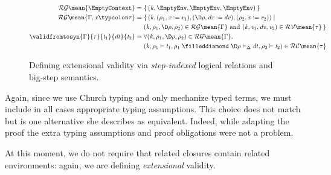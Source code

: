 \begin{figure}[h!]
\begin{align*}
                  \\
  \ensuremath{\mathcal{RG}\mean{\EmptyContext}} ={} & \{ \, \ensuremath{(\Varid{k},\EmptyEnv,\EmptyEnv,\EmptyEnv)} \, \} \\
  \ensuremath{\mathcal{RG}\mean{\Gamma,\Varid{x}\typcolon\tau}} ={} &
                                  \{ \, \ensuremath{(\Varid{k},(\rho_{1},\Varid{x}\mathbin{:=}\Varid{v}_{1}),(\D\rho,\Varid{dx}\mathbin{:=}\Varid{dv}),(\rho_{2},\Varid{x}\mathbin{:=}\Varid{v}_{2}))\mid\\&(\Varid{k},\rho_{1},\D\rho,\rho_{2})\in \mathcal{RG}\mean{\Gamma}\text{ and }(\Varid{k},\Varid{v}_{1},\Varid{dv},\Varid{v}_{2})\in \mathcal{RV}\mean{\tau}} \, \} \\
  \ensuremath{\validfromtosyn{\Gamma}{\tau}{\Varid{t}_{1}}{\Varid{dt}}{\Varid{t}_{2}}} ={}&
                                      \ensuremath{\forall (\Varid{k},\rho_{1},\D\rho,\rho_{2})\in \mathcal{RG}\mean{\Gamma}\hsforall \hsdot{\circ }{\mathpunct{.}}\\&(\Varid{k},\rho_{1}\vdash\Varid{t}_{1},\rho_{1}\mathrel{\filleddiamond}\D\rho\vdash_{\Delta}\Varid{dt},\rho_{2}\vdash\Varid{t}_{2})\in \mathcal{RC}\mean{\tau}}
\end{align*}
\caption{Defining extensional validity via \emph{step-indexed} logical relations and big-step semantics.}
\label{fig:big-step-validity-ext-si}
\end{figure}

Again, since we use Church typing and only mechanize typed terms, we
must include in all cases appropriate typing assumptions. This
choice does not match \citet{Ahmed2006stepindexed} but is
one alternative she describes as equivalent. Indeed, while
adapting the proof the extra typing assumptions and proof
obligations were not a problem.

At this moment, we do not require that related closures contain
related environments: again, we are defining \emph{extensional}
validity.

